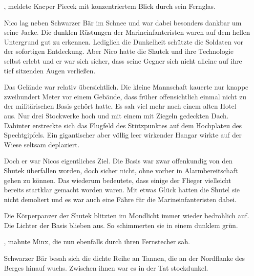 , meldete Kacper Piecek mit konzentriertem Blick durch sein Fernglas.

\par

Nico lag neben Schwarzer Bär im Schnee und war dabei besonders dankbar um seine Jacke. Die dunklen Rüstungen der Marineinfanteristen waren auf dem hellen Untergrund gut zu erkennen. Lediglich die Dunkelheit schützte die Soldaten vor der sofortigen Entdeckung. Aber Nico hatte die Shutek und ihre Technologie selbst erlebt und er war sich sicher, dass seine Gegner sich nicht alleine auf ihre tief sitzenden Augen verließen.

\par

Das Gelände war relativ übersichtlich. Die kleine Mannschaft kauerte nur knappe zweihundert Meter vor einem Gebäude, dass früher offensichtlich einmal nicht zu der militärischen Basis gehört hatte. Es sah viel mehr nach einem alten Hotel aus. Nur drei Stockwerke hoch und mit einem mit Ziegeln gedeckten Dach. Dahinter erstreckte sich das Flugfeld des Stützpunktes auf dem Hochplateu des Spechtgipfels. Ein gigantischer aber völlig leer wirkender Hangar wirkte auf der Wiese seltsam deplaziert.

\par

Doch er war Nicos eigentliches Ziel. Die Basis war zwar offenkundig von den Shutek überfallen worden, doch sicher nicht, ohne vorher in Alarmbereitschaft gehen zu können. Das wiederum bedeutete, dass einige der Flieger vielleicht bereits startklar gemacht worden waren. Mit etwas Glück hatten die Shutel sie nicht demoliert und es war auch eine Fähre für die Marineinfanteristen dabei.

\par

Die Körperpanzer der Shutek blitzten im Mondlicht immer wieder bedrohlich auf. Die Lichter der Basis blieben aus. So schimmerten sie in einem dunklem grün.

\par

, mahnte Minx, die nun ebenfalls durch ihren Fernstecher sah. 

\par

Schwarzer Bär besah sich die dichte Reihe an Tannen, die an der Nordflanke des Berges hinauf wuchs. Zwischen ihnen war es in der Tat stockdunkel.

